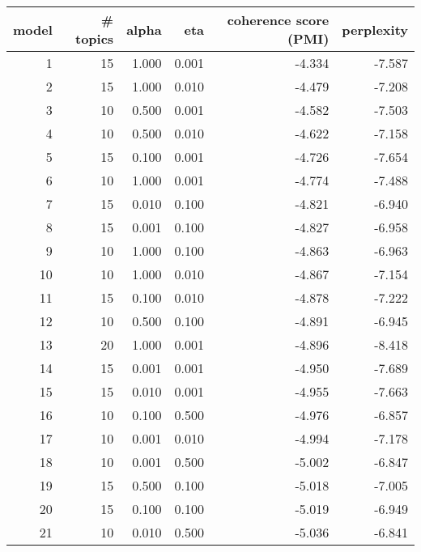 \begin{tabular}{rrrrrr}
\toprule
 model &  \# topics &  alpha &   eta &  coherence score (PMI) &  perplexity \\
\midrule
     1 &        15 &  1.000 & 0.001 &                 -4.334 &      -7.587 \\
     2 &        15 &  1.000 & 0.010 &                 -4.479 &      -7.208 \\
     3 &        10 &  0.500 & 0.001 &                 -4.582 &      -7.503 \\
     4 &        10 &  0.500 & 0.010 &                 -4.622 &      -7.158 \\
     5 &        15 &  0.100 & 0.001 &                 -4.726 &      -7.654 \\
     6 &        10 &  1.000 & 0.001 &                 -4.774 &      -7.488 \\
     7 &        15 &  0.010 & 0.100 &                 -4.821 &      -6.940 \\
     8 &        15 &  0.001 & 0.100 &                 -4.827 &      -6.958 \\
     9 &        10 &  1.000 & 0.100 &                 -4.863 &      -6.963 \\
    10 &        10 &  1.000 & 0.010 &                 -4.867 &      -7.154 \\
    11 &        15 &  0.100 & 0.010 &                 -4.878 &      -7.222 \\
    12 &        10 &  0.500 & 0.100 &                 -4.891 &      -6.945 \\
    13 &        20 &  1.000 & 0.001 &                 -4.896 &      -8.418 \\
    14 &        15 &  0.001 & 0.001 &                 -4.950 &      -7.689 \\
    15 &        15 &  0.010 & 0.001 &                 -4.955 &      -7.663 \\
    16 &        10 &  0.100 & 0.500 &                 -4.976 &      -6.857 \\
    17 &        10 &  0.001 & 0.010 &                 -4.994 &      -7.178 \\
    18 &        10 &  0.001 & 0.500 &                 -5.002 &      -6.847 \\
    19 &        15 &  0.500 & 0.100 &                 -5.018 &      -7.005 \\
    20 &        15 &  0.100 & 0.100 &                 -5.019 &      -6.949 \\
    21 &        10 &  0.010 & 0.500 &                 -5.036 &      -6.841 \\

\end{tabular}
